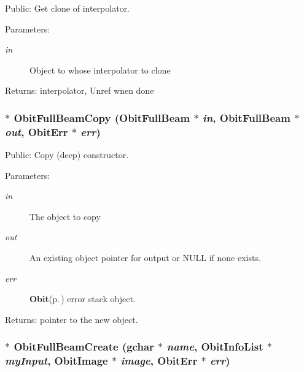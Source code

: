 Public: Get clone of interpolator. 

\begin{Desc}
\item[Parameters:]
\begin{description}
\item[{\em in}]Object to whose interpolator to clone \end{description}
\end{Desc}
\begin{Desc}
\item[Returns:]interpolator, Unref wnen done \end{Desc}
\subsubsection{$\ast$ Obit\-Full\-Beam\-Copy ({\bf Obit\-Full\-Beam} $\ast$ {\em in}, {\bf Obit\-Full\-Beam} $\ast$ {\em out}, {\bf Obit\-Err} $\ast$ {\em err})}\label{ObitFullBeam_8c_a9}


Public: Copy (deep) constructor. 

\begin{Desc}
\item[Parameters:]
\begin{description}
\item[{\em in}]The object to copy \item[{\em out}]An existing object pointer for output or NULL if none exists. \item[{\em err}]{\bf Obit}{\rm (p.\,\pageref{structObit})} error stack object. \end{description}
\end{Desc}
\begin{Desc}
\item[Returns:]pointer to the new object. \end{Desc}
\subsubsection{$\ast$ Obit\-Full\-Beam\-Create (gchar $\ast$ {\em name}, {\bf Obit\-Info\-List} $\ast$ {\em my\-Input}, {\bf Obit\-Image} $\ast$ {\em image}, {\bf Obit\-Err} $\ast$ {\em err})}\label{ObitFullBeam_8c_a11}



